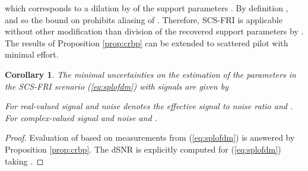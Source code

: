 \documentclass[journal,10pt]{IEEEtran}
\newtheorem{corollary}{Corollary}
\begin{document}
which corresponds to a dilation by  of the support parameters . By definition , and so the bound on  prohibits aliasing of . Therefore, SCS-FRI is applicable without other modification than division of the recovered support parameters by .
The results of Proposition \ref{prop:crbp} can be extended to scattered pilot with minimal effort.
\begin{corollary}
\label{thm:ofdmCRB}
The minimal uncertainties on the estimation of the parameters in the SCS-FRI scenario (\ref{eq:splofdm}) with  signals are given by

For real-valued signal and noise   denotes the effective signal to noise ratio and . For complex-valued signal and noise   and .
\end{corollary}
\begin{proof}

Evaluation of  based on measurements from (\ref{eq:splofdm}) is answered by Proposition \ref{prop:crbp}. The \textsf{dSNR} is explicitly computed for (\ref{eq:splofdm}) taking . \end{proof}
\end{document}
